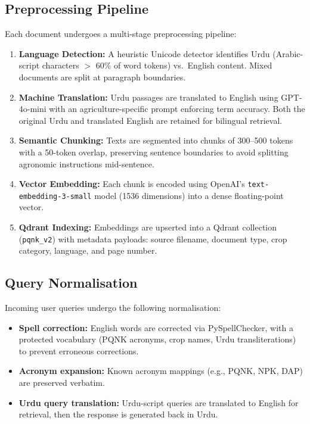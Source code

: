 \documentclass[12pt, a4paper]{article}
\begin{document}
\begin{onehalfspacing}
\subsection{Preprocessing Pipeline}

Each document undergoes a multi-stage preprocessing pipeline:

\begin{enumerate}
  \item \textbf{Language Detection:} A heuristic Unicode detector identifies
    Urdu (Arabic-script characters $>$ 60\% of word tokens) vs.\ English
    content. Mixed documents are split at paragraph boundaries.

  \item \textbf{Machine Translation:} Urdu passages are translated to English
    using GPT-4o-mini with an agriculture-specific prompt enforcing term accuracy.
    Both the original Urdu and translated English are retained for bilingual retrieval.

  \item \textbf{Semantic Chunking:} Texts are segmented into chunks of 300--500
    tokens with a 50-token overlap, preserving sentence boundaries to avoid
    splitting agronomic instructions mid-sentence.

  \item \textbf{Vector Embedding:} Each chunk is encoded using OpenAI's
    \texttt{text-embedding-3-small} model (1536 dimensions) into a dense
    floating-point vector.

  \item \textbf{Qdrant Indexing:} Embeddings are upserted into a Qdrant collection
    (\texttt{pqnk\_v2}) with metadata payloads: source filename, document type,
    crop category, language, and page number.
\end{enumerate}

\subsection{Query Normalisation}

Incoming user queries undergo the following normalisation:
\begin{itemize}[noitemsep]
  \item \textbf{Spell correction:} English words are corrected via PySpellChecker,
    with a protected vocabulary (PQNK acronyms, crop names, Urdu transliterations)
    to prevent erroneous corrections.
  \item \textbf{Acronym expansion:} Known acronym mappings (e.g., PQNK, NPK, DAP)
    are preserved verbatim.
  \item \textbf{Urdu query translation:} Urdu-script queries are translated to
    English for retrieval, then the response is generated back in Urdu.
\end{itemize}



\end{onehalfspacing}
\end{document}
